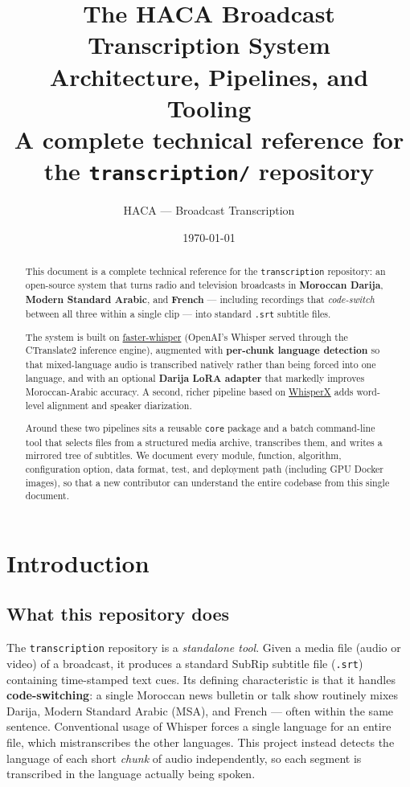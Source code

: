 \documentclass[11pt,a4paper]{report}
\title{\textbf{The HACA Broadcast Transcription System}\\[0.4em]
       \large Architecture, Pipelines, and Tooling\\[0.3em]
       \normalsize A complete technical reference for the \texttt{transcription/} repository}
\author{HACA --- Broadcast Transcription}
\date{\today}
\begin{document}
\maketitle

\begin{abstract}
\noindent
This document is a complete technical reference for the \texttt{transcription}
repository: an open-source system that turns radio and television broadcasts in
\textbf{Moroccan Darija}, \textbf{Modern Standard Arabic}, and \textbf{French}
--- including recordings that \emph{code-switch} between all three within a
single clip --- into standard \texttt{.srt} subtitle files.

The system is built on \href{https://github.com/SYSTRAN/faster-whisper}{faster-whisper}
(OpenAI's Whisper served through the CTranslate2 inference engine), augmented
with \textbf{per-chunk language detection} so that mixed-language audio is
transcribed natively rather than being forced into one language, and with an
optional \textbf{Darija LoRA adapter} that markedly improves Moroccan-Arabic
accuracy. A second, richer pipeline based on
\href{https://github.com/m-bain/whisperX}{WhisperX} adds word-level alignment and
speaker diarization.

Around these two pipelines sits a reusable \texttt{core} package and a batch
command-line tool that selects files from a structured media archive, transcribes
them, and writes a mirrored tree of subtitles. We document every module,
function, algorithm, configuration option, data format, test, and deployment path
(including GPU Docker images), so that a new contributor can understand the entire
codebase from this single document.
\end{abstract}

\tableofcontents

\chapter{Introduction}

\section{What this repository does}

The \texttt{transcription} repository is a \emph{standalone tool}. Given a media
file (audio or video) of a broadcast, it produces a standard SubRip subtitle file
(\texttt{.srt}) containing time-stamped text cues. Its defining characteristic is
that it handles \textbf{code-switching}: a single Moroccan news bulletin or talk
show routinely mixes Darija, Modern Standard Arabic (MSA), and French --- often
within the same sentence. Conventional usage of Whisper forces a single language
for an entire file, which mistranscribes the other languages. This project instead
detects the language of each short \emph{chunk} of audio independently, so each
segment is transcribed in the language actually being spoken.
\end{document}
